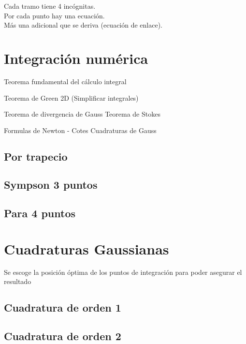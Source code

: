Cada tramo tiene 4 inc\'ognitas.\\
Por cada punto hay una ecuaci\'on.\\
M\'as una adicional que se deriva (ecuaci\'on de enlace).

\section{Integraci\'on num\'erica}

Teorema fundamental del c\'alculo integral

Teorema de Green 2D (Simplificar integrales)

Teorema de divergencia de Gauss
Teorema de Stokes


Formulas de Newton - Cotes
Cuadraturas de Gauss

\subsection{Por trapecio}

\subsection{Sympson 3 puntos}

\subsection{Para 4 puntos}

\section{Cuadraturas Gaussianas}
Se escoge la posici\'on \'optima de los puntos de integraci\'on para poder asegurar el resultado


\subsection{Cuadratura de orden 1}

\subsection{Cuadratura de orden 2}

